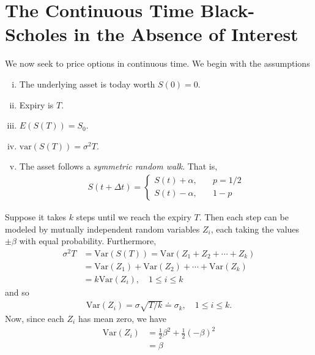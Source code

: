 \documentclass[12pt]{article}
\newcommand{\var}{\text{Var}}
\theoremstyle{plain}
\theoremstyle{definition}
\theoremstyle{remark}
\numberwithin{equation}{section}  %
\begin{document}
	\section{The Continuous Time Black-Scholes in the Absence of Interest}
	We now seek to price options in continuous time. We begin with the assumptions
	\begin{enumerate}[(i)]
		\item The underlying asset is today worth $S(0) = 0$.
		\item Expiry is $T$.
		\item $E(S(T)) = S_{0}$.
		\item $\text{var}(S(T)) = \sigma^{2} T$.
		\item The asset follows a \emph{symmetric random walk}. That is, 
			\begin{equation*}
				\begin{split}
					S(t + \Delta t)  = \begin{cases}
						S(t) + \alpha, \quad & p = 1/2 \\
						S(t) - \alpha, \quad & 1-p
					\end{cases}
				\end{split}
			\end{equation*}
	\end{enumerate}
	Suppose it takes $k$ steps until we reach the expiry $T$. Then
	each step can be modeled by mutually independent random variables
	$Z_{i}$, each taking the values $\pm \beta$ with equal probability.
	Furthermore, 
	\begin{equation*}
		\begin{split}
			\sigma^{2} T
			& = \var(S(T)) = \var(Z_{1} + Z_{2} + \cdots + Z_{k})
			\\
			& = \var(Z_{1}) + \var(Z_{2}) + \cdots + \var(Z_{k})
			\\
			& = k \var(Z_{i}), \quad 1 \le i \le k
		\end{split}
	\end{equation*}
	and so
	\begin{equation*}
		\begin{split}
			\var(Z_{i}) = \sigma \sqrt{T/k} \doteq \sigma_{k}, \quad 1 \le i \le k.
		\end{split}
	\end{equation*}
	Now, since each $Z_{i}$ has mean zero, we have
	\begin{equation*}
		\begin{split}
			\var(Z_{i}) & = \frac{1}{2}\beta^{2} + \frac{1}{2}{(-\beta)}^{2}
			\\
			& = \beta
		\end{split}
	\end{equation*}
\end{document}
